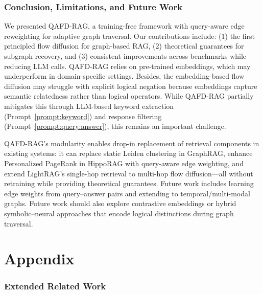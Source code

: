 \documentclass{article} %
\begin{document}
\section{Conclusion, Limitations, and Future Work}
{
We presented QAFD-RAG, a training-free framework with query-aware edge reweighting for adaptive graph traversal. Our contributions include: (1) the first principled flow diffusion for graph-based RAG, (2) theoretical guarantees for subgraph recovery, and (3) consistent improvements across benchmarks while reducing LLM calls. QAFD-RAG relies on pre-trained embeddings, which may underperform in domain-specific settings. {Besides, the embedding-based flow diffusion may struggle with explicit logical negation because embeddings capture semantic relatedness rather than logical operators. While QAFD-RAG partially mitigates this through LLM-based keyword extraction (Prompt~\ref{prompt:keyword}) and response filtering (Prompt~\ref{prompt:query:answer}), this remains an important challenge.}

QAFD-RAG's modularity enables drop-in replacement of retrieval components in existing systems: it can replace static Leiden clustering in GraphRAG, enhance Personalized PageRank in HippoRAG with query-aware edge weighting, and extend LightRAG's single-hop retrieval to multi-hop flow diffusion—all without retraining while providing theoretical guarantees.  Future work includes learning edge weights from query–answer pairs and extending to temporal/multi-modal graphs. Future work should also explore contrastive embeddings or hybrid symbolic–neural approaches that encode logical distinctions during graph traversal.}







\newpage
\appendix
\part*{Appendix}
\startcontents[part]  %


\newpage
\renewcommand{\thesection}{A\arabic{section}}
\vspace{-.2cm}
\section{Extended Related Work}\label{sec:app:related}
\end{document}
